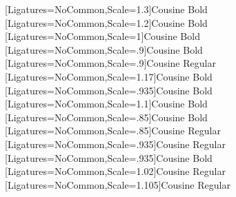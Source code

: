 \usepackage{amsmath}
\usepackage{mathspec}
\setmonofont[Ligatures=NoCommon,Scale=.9,SlantedFont={Cousine Italic},BoldFont={Cousine Bold},BoldSlantedFont={Cousine Bold Italic}]{Cousine Regular} %
\newfontface{\SecCode}[Ligatures=NoCommon,Scale=1.3]{Cousine Bold}
\newfontface{\SubsecCode}[Ligatures=NoCommon,Scale=1.2]{Cousine Bold}
\newfontface{\SubsubsecCode}[Ligatures=NoCommon,Scale=1]{Cousine Bold}
\newfontface{\ParaCode}[Ligatures=NoCommon,Scale=.9]{Cousine Bold}
\newfontface{\SubparaCode}[Ligatures=NoCommon,Scale=.9]{Cousine Regular}
\newfontface{\RHCode}[Ligatures=NoCommon,Scale=1.17]{Cousine Bold} %
\newfontface{\RHCodeEleven}[Ligatures=NoCommon,Scale=.935]{Cousine Bold}
\newfontface{\RHCodeTwelve}[Ligatures=NoCommon,Scale=1.1]{Cousine Bold}
\newfontface{\TOCCode}[Ligatures=NoCommon,Scale=.85]{Cousine Bold}
\newfontface{\TOCCodeR}[Ligatures=NoCommon,Scale=.85]{Cousine Regular}
\newfontface{\TOCCodeEleven}[Ligatures=NoCommon,Scale=.935]{Cousine Regular}
\newfontface{\TOCCodeElevenB}[Ligatures=NoCommon,Scale=.935]{Cousine Bold}
\newfontface{\TOCCodeTwelve}[Ligatures=NoCommon,Scale=1.02]{Cousine Regular}
\newfontface{\TOCCodeThirteen}[Ligatures=NoCommon,Scale=1.105]{Cousine Regular}

